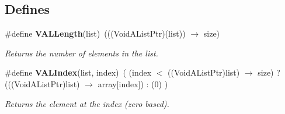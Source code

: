 \subsection*{Defines}
\begin{CompactItemize}
\item 
\#define {\bf VALLength}(list)\ (((Void\-AList\-Ptr)(list)) $\rightarrow$ size)
\begin{CompactList}\small\item\em Returns the number of elements in the list. \item\end{CompactList}\item 
\#define {\bf VALIndex}(list, index)\ ( (index $<$ ((Void\-AList\-Ptr)list) $\rightarrow$ size) ? (((Void\-AList\-Ptr)list) $\rightarrow$ array[index]) : (0) )
\begin{CompactList}\small\item\em Returns the element at the index (zero based). \item\end{CompactList}\end{CompactItemize}
